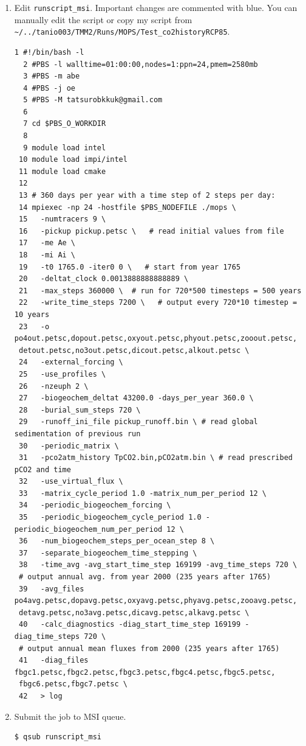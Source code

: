 \documentclass[a4paper]{article}
\begin{document}
\begin{enumerate}
\item Edit \verb|runscript_msi|. Important changes are commented with blue. You can manually edit the script or copy my script from \\ \verb|~/../tanio003/TMM2/Runs/MOPS/Test_co2historyRCP85|.
\lstset{language=sh} 
\begin{lstlisting}[frame=single,basicstyle=\scriptsize,commentstyle=\color{blue}]
  1 #!/bin/bash -l
  2 #PBS -l walltime=01:00:00,nodes=1:ppn=24,pmem=2580mb
  3 #PBS -m abe
  4 #PBS -j oe
  5 #PBS -M tatsurobkkuk@gmail.com
  6
  7 cd $PBS_O_WORKDIR
  8
  9 module load intel
 10 module load impi/intel
 11 module load cmake
 12
 13 # 360 days per year with a time step of 2 steps per day:
 14 mpiexec -np 24 -hostfile $PBS_NODEFILE ./mops \
 15   -numtracers 9 \
 16   -pickup pickup.petsc \   # read initial values from file
 17   -me Ae \
 18   -mi Ai \
 19   -t0 1765.0 -iter0 0 \   # start from year 1765
 20   -deltat_clock 0.0013888888888889 \   
 21   -max_steps 360000 \  # run for 720*500 timesteps = 500 years
 22   -write_time_steps 7200 \   # output every 720*10 timestep = 10 years
 23   -o po4out.petsc,dopout.petsc,oxyout.petsc,phyout.petsc,zooout.petsc,
 detout.petsc,no3out.petsc,dicout.petsc,alkout.petsc \
 24   -external_forcing \
 25   -use_profiles \
 26   -nzeuph 2 \
 27   -biogeochem_deltat 43200.0 -days_per_year 360.0 \
 28   -burial_sum_steps 720 \
 29   -runoff_ini_file pickup_runoff.bin \ # read global sedimentation of previous run
 30   -periodic_matrix \
 31   -pco2atm_history TpCO2.bin,pCO2atm.bin \ # read prescribed pCO2 and time
 32   -use_virtual_flux \
 33   -matrix_cycle_period 1.0 -matrix_num_per_period 12 \
 34   -periodic_biogeochem_forcing \
 35   -periodic_biogeochem_cycle_period 1.0 -periodic_biogeochem_num_per_period 12 \
 36   -num_biogeochem_steps_per_ocean_step 8 \
 37   -separate_biogeochem_time_stepping \
 38   -time_avg -avg_start_time_step 169199 -avg_time_steps 720 \ 
 # output annual avg. from year 2000 (235 years after 1765)
 39   -avg_files po4avg.petsc,dopavg.petsc,oxyavg.petsc,phyavg.petsc,zooavg.petsc,
 detavg.petsc,no3avg.petsc,dicavg.petsc,alkavg.petsc \
 40   -calc_diagnostics -diag_start_time_step 169199 -diag_time_steps 720 \ 
 # output annual mean fluxes from 2000 (235 years after 1765)
 41   -diag_files fbgc1.petsc,fbgc2.petsc,fbgc3.petsc,fbgc4.petsc,fbgc5.petsc,
 fbgc6.petsc,fbgc7.petsc \
 42   > log
\end{lstlisting}

\item Submit the job to MSI queue.
\begin{lstlisting}[style=DOS]
 $ qsub runscript_msi
\end{lstlisting}


\end{enumerate}
\end{document}
